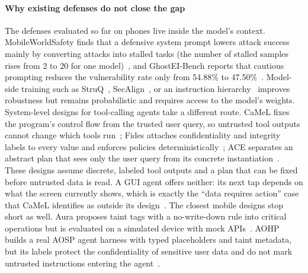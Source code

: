 \paragraph{Why existing defenses do not close the gap}
The defenses evaluated so far on phones live inside the model's context. MobileWorldSafety finds that a defensive system prompt lowers attack success mainly by converting attacks into stalled tasks (the number of stalled samples rises from 2 to 20 for one model)~\cite{chen2026mobileworldsafety}, and GhostEI-Bench reports that cautious prompting reduces the vulnerability rate only from 54.88\% to 47.50\%~\cite{chen2025ghosteibench}. Model-side training such as StruQ~\cite{chen2025struq}, SecAlign~\cite{chen2025secalign}, or an instruction hierarchy~\cite{wallace2024instruction} improves robustness but remains probabilistic and requires access to the model's weights. System-level designs for tool-calling agents take a different route. CaMeL fixes the program's control flow from the trusted user query, so untrusted tool outputs cannot change which tools run~\cite{debenedetti2025camel}; Fides attaches confidentiality and integrity labels to every value and enforces policies deterministically~\cite{costa2025fides}; ACE separates an abstract plan that sees only the user query from its concrete instantiation~\cite{li2026ace}. These designs assume discrete, labeled tool outputs and a plan that can be fixed before untrusted data is read. A GUI agent offers neither: its next tap depends on what the screen currently shows, which is exactly the ``data requires action'' case that CaMeL identifies as outside its design~\cite{debenedetti2025camel}. The closest mobile designs stop short as well. Aura proposes taint tags with a no-write-down rule into critical operations but is evaluated on a simulated device with mock APIs~\cite{zou2026aura}. AOHP builds a real AOSP agent harness with typed placeholders and taint metadata, but its labels protect the confidentiality of sensitive user data and do not mark untrusted instructions entering the agent~\cite{zhao2026aohp}.

